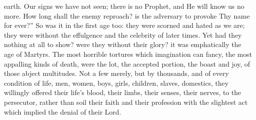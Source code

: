 earth. Our signs we have not seen; there is no Prophet,
and He will know us no more. How long shall the enemy
reproach? is the adversary to provoke Thy name for
ever?'' So was it in the first age too: they were
scorned and hated as we are; they were without the
effulgence and the celebrity of later times. Yet had they
nothing at all to show? were they without their glory? it
was emphatically the age of Martyrs. The most horrible
tortures which imagination can fancy, the most appalling
kinds of death, were the lot, the accepted portion, the
boast and joy, of those abject multitudes. Not a few
merely, but by thousands, and of every condition of life,
men, women, boys, girls, children, slaves, domestics,
they willingly offered their life's blood, their limbs,
their senses, their nerves, to the persecutor, rather
than soil their faith and their profession with the
slightest act which implied the denial of their Lord.

